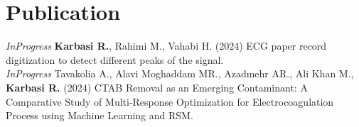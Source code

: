 
\section{Publication}
  \vspace{2pt}
  \resumeSubHeadingListStart
    \small{\item{

    \textit{\color{MidnightBlue}InProgress}{    \textbf{Karbasi R.}, Rahimi M., Vahabi H. (2024) ECG paper record digitization to detect different peaks of the signal.} \\ \vspace{3pt}
    \textit{\color{MidnightBlue}InProgress}{    Tavakolia A., Alavi Moghaddam MR., Azadmehr AR., Ali Khan M., \textbf{Karbasi R.} (2024) CTAB Removal as an Emerging Contaminant: A Comparative Study of Multi-Response Optimization for Electrocoagulation Process using Machine Learning and RSM.} \\ \vspace{3pt}

    }}
  \resumeSubHeadingListEnd
